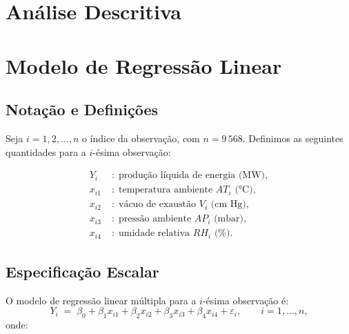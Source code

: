 \documentclass[12pt, a4paper]{article}
\begin{document}
\section*{Análise Descritiva}

\section*{Modelo de Regressão Linear}

\subsection*{Notação e Definições}
 
Seja $i = 1, 2, \ldots, n$ o índice da observação, com $n = 9\,568$.
Definimos as seguintes quantidades para a $i$-ésima observação:
 
\begin{align*}
  Y_i    &\;:\; \text{produção líquida de energia (MW)}, \\
  x_{i1} &\;:\; \text{temperatura ambiente } AT_i \text{ (°C)}, \\
  x_{i2} &\;:\; \text{vácuo de exaustão } V_i \text{ (cm Hg)}, \\
  x_{i3} &\;:\; \text{pressão ambiente } AP_i \text{ (mbar)}, \\
  x_{i4} &\;:\; \text{umidade relativa } RH_i \text{ (\%)}.
\end{align*}
 
\subsection*{Especificação Escalar}
 
 
O modelo de regressão linear múltipla para a $i$-ésima observação é:
\begin{equation}
  Y_i \;=\; \beta_0 + \beta_1 x_{i1} + \beta_2 x_{i2}
           + \beta_3 x_{i3} + \beta_4 x_{i4} + \varepsilon_i,
  \qquad i = 1, \ldots, n,
  \label{eq:modelo_escalar}
\end{equation}
onde:
 
\end{document}
